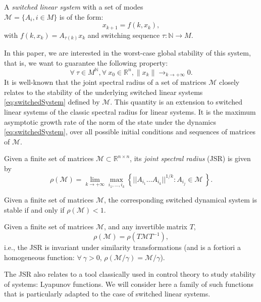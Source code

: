 A \emph{switched linear system} with a set of modes \\ 
\mbox{$\mathcal{M}= \{A_i, i \in M \}$} is of the form:
\begin{equation}\label{eq:switchedSystem}
x_{k+1} = f(k,x_k),
\end{equation}
with $f(k,x_k) = A_{\tau(k)}x_k$ and switching sequence \mbox{$\tau: \mathbb{N} \to M$}.

In this paper, we are interested in the worst-case global stability of this system, that is, we want to guarantee the following property: $$\forall\ \tau \in M^{\mathbb{N}}, \forall\ x_0 \in \mathbb{R}^n, \lVert x_k \rVert \to_{k \to +\infty} 0.$$ 
It is well-known that the joint spectral radius of a set of matrices $\mathcal{M}$ closely relates to the stability of the underlying switched linear systems \eqref{eq:switchedSystem} defined by $\mathcal{M}$. This quantity is an extension to switched linear systems of the classic spectral radius for linear systems. It is the maximum asymptotic growth rate of the norm of the state under the dynamics \eqref{eq:switchedSystem}, over all possible initial conditions and sequences of matrices of $\mathcal{M}$.

\begin{defn} 
Given a finite set of matrices \mbox{$\mathcal{M} \subset \mathbb{R}^{n\times n}$}, its \emph{joint spectral radius} (JSR) is given by $$\rho(\mathcal{M}) =\lim_{k \rightarrow +\infty} \max_{i_1,\dots, i_k} \left\{ ||A_{i_1} \dots A_{i_k}||^{1/k}: A_{i_j} \in \mathcal{M}\ \right\}. $$
\end{defn}

\begin{property}
Given a finite set of matrices $\mathcal{M}$, the corresponding switched dynamical system is stable if and only if $\rho(\mathcal{M})<1$.
\end{property}

\begin{property}\label{rem:scaling}
Given a finite set of matrices $\mathcal{M}$, and any invertible matrix $T$, $$\rho(\mathcal{M})=\rho(T \mathcal{M} T^{-1}),$$
i.e., the JSR is invariant under similarity transformations (and is a fortiori a homogeneous function: $\forall\  \gamma > 0$, $\rho \left( \mathcal{M}/\gamma \right) = \mathcal{M}/\gamma$).
\end{property}

The JSR also relates to a tool classically used in control theory to study stability of systems: Lyapunov functions. We will consider here a family of such functions that is particularly adapted to the case of switched linear systems.

